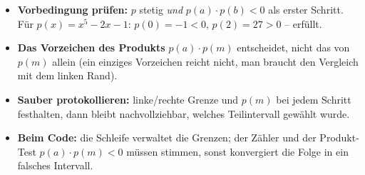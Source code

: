 \begin{achtung}
\begin{itemize}
  \item \textbf{Vorbedingung prüfen:} $p$ stetig \emph{und}
        $p(a)\cdot p(b)<0$ als erster Schritt. Für $p(x)=x^5-2x-1$:
        $p(0)=-1<0$, $p(2)=27>0$ -- erfüllt.
  \item \textbf{Das Vorzeichen des Produkts} $p(a)\cdot p(m)$ entscheidet,
        nicht das von $p(m)$ allein (ein einziges Vorzeichen reicht nicht,
        man braucht den Vergleich mit dem linken Rand).
  \item \textbf{Sauber protokollieren:} linke/rechte Grenze und $p(m)$ bei
        jedem Schritt festhalten, dann bleibt nachvollziehbar, welches
        Teilintervall gewählt wurde.
  \item \textbf{Beim Code:} die Schleife verwaltet die Grenzen; der Zähler
        und der Produkt-Test $p(a)\cdot p(m)<0$ müssen stimmen, sonst
        konvergiert die Folge in ein falsches Intervall.
\end{itemize}
\end{achtung}

